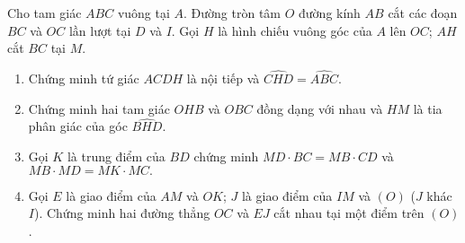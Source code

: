 \begin{bt}%
	Cho tam giác $ABC$ vuông tại $A$. Đường tròn tâm $O$ đường kính $AB$ cắt các đoạn $BC$ và $OC$ lần lượt tại $D$ và $I$. Gọi $H$ là hình chiếu vuông góc của $A$ lên $OC$; $AH$ cắt $BC$ tại $M$.
	\begin{enumerate}
		\item Chứng minh tứ giác $ACDH$ là nội tiếp và $\widehat{CHD}=\widehat{ABC}$.
		\item Chứng minh hai tam giác $OHB$ và $OBC$ đồng dạng với nhau và $HM$ là tia phân giác của góc $\widehat{BHD}$.
		\item Gọi $K$ là trung điểm của $BD$ chứng minh $MD\cdot BC=MB\cdot CD$ và $MB\cdot MD=MK\cdot MC.$
		\item Gọi $E$ là giao điểm của $AM$ và $OK$; $J$ là giao điểm của $IM$ và $(O)$ ($J$ khác $I$). Chứng minh hai đường thẳng $OC$ và $EJ$ cắt nhau tại một điểm trên $(O)$.
	\end{enumerate}
\end{bt}
